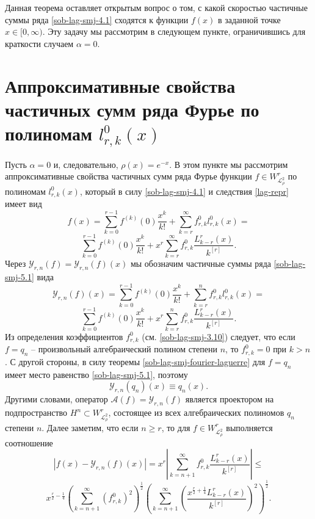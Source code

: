 Данная теорема оставляет открытым вопрос о том, с какой скоростью частичные суммы ряда \eqref{sob-lag-smj-4.1} сходятся к функции $f(x)$ в заданной точке $x\in[0,\infty)$. Эту задачу мы рассмотрим в следующем пункте, ограничившись для  краткости случаем $\alpha=0$.

\section{Аппроксимативные свойства частичных сумм ряда Фурье по полиномам $l_{r,k}^0(x)$}
Пусть $\alpha=0$ и, следовательно, $\rho(x)=e^{-x}$. В этом пункте мы рассмотрим аппроксимативные свойства частичных сумм ряда Фурье функции $f\in W^r_{\mathcal{L}^2_\rho}$ по полиномам $l_{r,k}^0(x)$, который в силу \eqref{sob-lag-smj-4.1} и следствия \ref{lag-repr} имеет вид
$$
f(x)= \sum_{k=0}^{r-1} f^{(k)}(0)\frac{x^k}{k!}+ \sum_{k=r}^\infty f_{r,k}^0 l_{r,k}^0(x)=
$$
\begin{equation}\label{sob-lag-smj-5.1}
 \sum_{k=0}^{r-1} f^{(k)}(0)\frac{x^k}{k!}+ x^r\sum_{k=r}^\infty f_{r,k}^0\frac{L_{k-r}^{r}(x)}{k^{[r]}}.
\end{equation}
Через $\mathcal{Y}_{r,n}(f)=\mathcal{Y}_{r,n}(f)(x)$ мы обозначим  частичные суммы ряда \eqref{sob-lag-smj-5.1}  вида
$$
\mathcal{Y}_{r,n}(f)(x)= \sum_{k=0}^{r-1} f^{(k)}(0)\frac{x^k}{k!}+ \sum_{k=r}^n f_{r,k}^0 l_{r,k}^0(x)=
$$
 \begin{equation}\label{sob-lag-smj-5.2}
 \sum_{k=0}^{r-1} f^{(k)}(0)\frac{x^k}{k!}+x^r\sum_{k=r}^n f_{r,k}^0\frac{L_{k-r}^{r}(x)}{k^{[r]}}.
\end{equation}
Из определения коэффициентов $f_{r,k}^0$  (см.  \eqref{sob-lag-smj-3.10}) следует, что если $f=q_n$ -- произвольный алгебраический полином степени $n$, то $f_{r,k}^0=0$  при $k>n$. С другой стороны, в силу теоремы \ref{sob-lag-smj-fourier-laguerre} для $f=q_n$ имеет место равенство  \eqref{sob-lag-smj-5.1}, поэтому
\begin{equation}\label{sob-lag-smj-5.3}
\mathcal{Y}_{r,n}(q_n)(x)\equiv q_n(x).
\end{equation}
Другими словами, оператор $\mathcal{A}(f)=\mathcal{Y}_{r,n}(f)$ является проектором на подпространство $H^n\subset W^r_{\mathcal{L}_{\rho}^2}$, состоящее из всех  алгебраических полиномов $q_n$ степени $n$. Далее заметим, что если $n\ge r$, то для $f \in W^r_{\mathcal{L}_{\rho}^2}$ выполняется соотношение
$$
|f(x)-\mathcal{Y}_{r,n}(f)(x)|=x^r|\sum_{k=n+1}^\infty  f_{r,k}^0\frac{L_{k-r}^{r}(x)}{k^{[r]}}|\le
$$
\begin{equation}\label{sob-lag-smj-5.4}
x^{\frac r2-\frac14}\left(\sum_{k=n+1}^\infty  (f_{r,k}^0)^2\right)^\frac12
\left(\sum_{k=n+1}^\infty  \left(\frac{x^{\frac r2+\frac14}L_{k-r}^{r}(x)}{k^{[r]}}\right)^2\right)^\frac12.
\end{equation}

